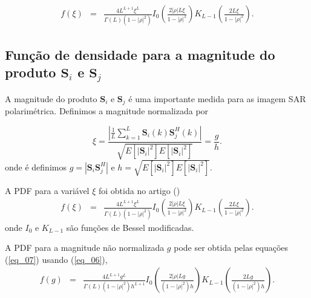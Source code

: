 \documentclass[conference]{IEEEtran}
\begin{document}
\begin{equation}
\begin{array}{ccc}
	f(\xi)&=&\frac{4L^{L+1}\xi^L}{\Gamma(L)(1-|\rho|^2)}I_0\left(\frac{2|\rho|L\xi}{1-|\rho|^2}\right)K_{L-1}\left(\frac{2L\xi}{1-|\rho|^2}\right).
		\end{array}
\end{equation}
\subsection{Função de densidade para a magnitude do produto $\mathbf{S}_i$ e $\mathbf{S}_j$}
A magnitude do produto $\mathbf{S}_i$ e $\mathbf{S}_j$ é uma importante medida para as imagem SAR polarimétrica. Definimos a magnitude normalizada por 

\begin{equation}\label{eq_06}
	\xi = \frac{\left|\frac{1}{L} \sum_{k=1}^L\mathbf{S}_i(k)\mathbf{S}_j^H(k) \right|}{\sqrt{E[|\mathbf{S}_i|^2]E[|\mathbf{S}_i|^2]}}=\frac{g}{h}.
\end{equation}
onde é definimos $g=|\mathbf{S}_i\mathbf{S}_j^H|$ e $h=\sqrt{E[|\mathbf{S}_i|^2]E[|\mathbf{S}_i|^2]}$.

A PDF para a variável  $\xi$ foi obtida no artigo (\cite{lee})
\begin{equation}\label{eq_07}
\begin{array}{ccc}
	f(\xi)&=&\frac{4L^{L+1}\xi^L}{\Gamma(L)(1-|\rho|^2)}I_0\left(\frac{2|\rho|L\xi}{1-|\rho|^2}\right)K_{L-1}\left(\frac{2L\xi}{1-|\rho|^2}\right).
		\end{array}
\end{equation}
onde $I_0$ e $K_{L-1}$ são funções de Bessel modificadas.

A PDF para a magnitude não normalizada $g$ pode ser obtida pelas equações (\ref{eq_07}) usando (\ref{eq_06}),
\begin{equation}
\begin{array}{ccc}\label{eq_08}
	f(g)&=&\frac{4L^{L+1}g^L}{\Gamma(L)(1-|\rho|^2)h^{L+1}}I_0\left(\frac{2|\rho|Lg}{(1-|\rho|^2)h}\right)K_{L-1}\left(\frac{2Lg}{(1-|\rho|^2)h}\right).
		\end{array}
\end{equation}
\end{document}
